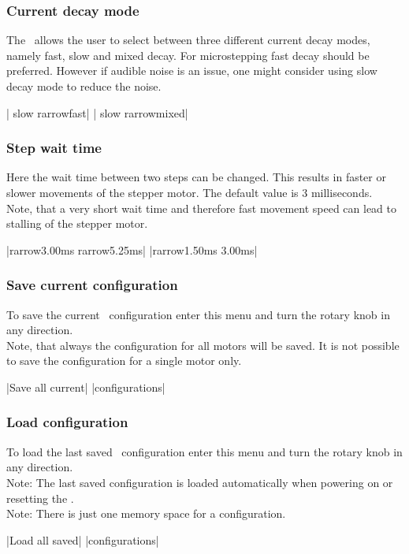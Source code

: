 \subsubsection{Current decay mode}
\label{menu_current_decay}
The \productName ~allows the user to select between three different current decay modes, namely fast, slow and mixed decay. For microstepping fast decay should be preferred. However if audible noise is an issue, one might consider using slow decay mode to reduce the noise.
\begin{center}
  | slow   {rarrow}fast|
             | slow   {rarrow}mixed|
\end{center}


\subsubsection{Step wait time}
\label{menu_step_wait_time}
Here the wait time between two steps can be changed. This results in faster or slower movements of the stepper motor. The default value is 3 milliseconds.\\
Note, that a very short wait time and therefore fast movement speed can lead to stalling of the stepper motor.
\begin{center}
  |{rarrow}3.00ms {rarrow}5.25ms|
             |{rarrow}1.50ms  3.00ms|
\end{center}

\subsubsection{Save current configuration}
\label{menu_save}
To save the current \productName ~configuration enter this menu and turn the rotary knob in any direction.\\
Note, that always the configuration for all motors will be saved. It is not possible to save the configuration for a single motor only.
\begin{center}
  |Save all current|
             |configurations|
\end{center}


\subsubsection{Load configuration}
\label{chp:menu_load}
To load the last saved \productName ~configuration enter this menu and turn the rotary knob in any direction.\\
Note: The last saved configuration is loaded automatically when powering on or resetting the \productName.\\
Note: There is just one memory space for a configuration.
\begin{center}
  |Load all saved|
             |configurations|
\end{center}


